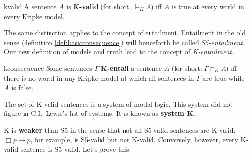 \begin{definition}{}{kvalid}
  A sentence $A$ is \textbf{K-valid} (for short, $\models_K A$) iff $A$
  is true at every world in every Kripke model.
\end{definition}


The same distinction applies to the concept of entailment. Entailment in the old
sense (definition \ref{def:basicconsequence}) will henceforth be called
\emph{S5-entailment}. Our new definition of models and truth lead to the
concept of \emph{K-entailment}.

\begin{definition}{}{kconsequence}
  Some sentences $\Gamma$ \textbf{K-entail} a sentence $A$ (for short:
  $\Gamma \models_{K} A$) iff there is no world in any Kripke model at which all
  sentences in $\Gamma$ are true while $A$ is false.
\end{definition}

The set of K-valid sentences is a system of modal logic. This system did
not figure in C.I.\ Lewis's list of systems. It is known as \textbf{system K}.

K is \textbf{weaker} than S5 in the sense that not all S5-valid sentences are
K-valid. $\Box p \to p$, for example, is S5-valid but not K-valid. Conversely,
however, every K-valid sentence is S5-valid. Let's prove this.

